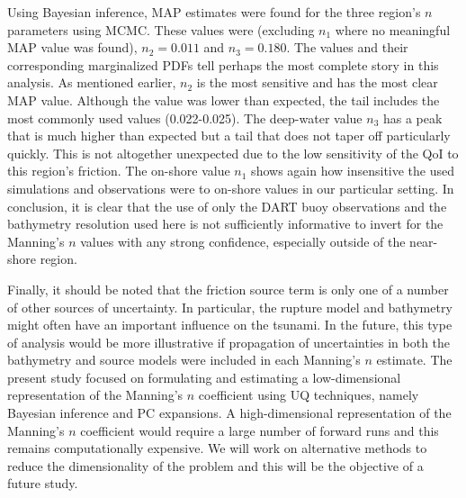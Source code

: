 Using Bayesian inference, MAP estimates were found for the three region's $n$
parameters using MCMC.  These values were (excluding $n_1$ where no meaningful
MAP value was found), $n_2=0.011$ and $n_3=0.180$.  The values and their
corresponding marginalized PDFs tell perhaps the most
complete story in this analysis.  As mentioned earlier, $n_2$ is the most
sensitive and has the most clear MAP value.  Although the value was lower than
expected, the tail includes the most commonly used values (0.022-0.025).  The
deep-water value $n_3$ has a peak that is much higher than expected but a tail
that does not taper off particularly quickly.  This is not altogether unexpected
due to the low sensitivity of the QoI to this region's friction.  The
on-shore value $n_1$ shows again how insensitive the used simulations and
observations were to on-shore values in our particular setting.  
In conclusion, it is clear that the use of only the DART buoy observations and the 
bathymetry resolution used here is not sufficiently informative to invert for the 
Manning's $n$ values with any strong confidence, especially outside of the near-shore region.

Finally, it should be noted that the friction source term is only one of a
number of other sources of uncertainty.  In particular, the rupture model and
bathymetry might often have an important influence on the tsunami.  
In the future, this type of analysis would be more illustrative if
propagation of uncertainties in both the bathymetry and source models were
included in each Manning's $n$ estimate.  The
present study focused on formulating and estimating a low-dimensional
representation of the Manning's $n$ coefficient using UQ techniques, namely
Bayesian inference and PC expansions.  A high-dimensional representation of the
Manning's $n$ coefficient would require a large number of forward runs and this remains
computationally expensive.  We will work on alternative methods to reduce the
dimensionality of the problem and this will be the objective of a future study.

